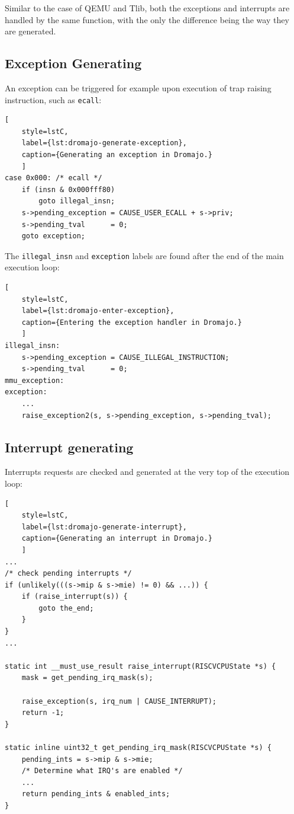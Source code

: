 Similar to the case of QEMU and Tlib, both the exceptions and interrupts are handled by the same function, with the only
the difference being the way they are generated.

\subsection*{Exception Generating}

An exception can be triggered for example upon execution of trap raising instruction, such as \texttt{ecall}:

\begin{lstlisting}[
    style=lstC,
    label={lst:dromajo-generate-exception},
    caption={Generating an exception in Dromajo.}
    ]
case 0x000: /* ecall */
    if (insn & 0x000fff80)
        goto illegal_insn;
    s->pending_exception = CAUSE_USER_ECALL + s->priv;
    s->pending_tval      = 0;
    goto exception;
\end{lstlisting}

\pagebreak

\noindent
The \texttt{illegal\_insn} and \texttt{exception} labels are found after the end of the main execution loop:

\begin{lstlisting}[
    style=lstC,
    label={lst:dromajo-enter-exception},
    caption={Entering the exception handler in Dromajo.}
    ]
illegal_insn:
    s->pending_exception = CAUSE_ILLEGAL_INSTRUCTION;
    s->pending_tval      = 0;
mmu_exception:
exception:
    ...
    raise_exception2(s, s->pending_exception, s->pending_tval);
\end{lstlisting}

\subsection*{Interrupt generating}

Interrupts requests are checked and generated at the very top of the execution loop:

\begin{lstlisting}[
    style=lstC,
    label={lst:dromajo-generate-interrupt},
    caption={Generating an interrupt in Dromajo.}
    ]
...
/* check pending interrupts */
if (unlikely(((s->mip & s->mie) != 0) && ...)) {
    if (raise_interrupt(s)) {
        goto the_end;
    }
}
...

static int __must_use_result raise_interrupt(RISCVCPUState *s) {
    mask = get_pending_irq_mask(s);

    raise_exception(s, irq_num | CAUSE_INTERRUPT);
    return -1;
}

static inline uint32_t get_pending_irq_mask(RISCVCPUState *s) {
    pending_ints = s->mip & s->mie;
    /* Determine what IRQ's are enabled */
    ...
    return pending_ints & enabled_ints;
}
\end{lstlisting}

